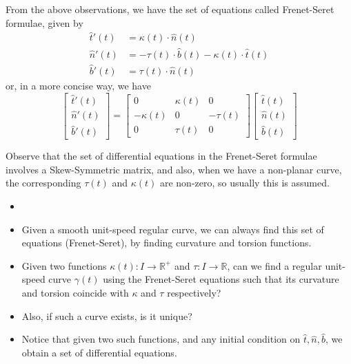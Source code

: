 \begin{theorem}
    From the above observations, we have the set of equations called Frenet-Seret formulae, given by
    $$
    \begin{aligned}
        \hat{t}'(t)&=\kappa(t)\cdot \hat{n}(t)\\ 
        \hat{n}'(t)&=-\tau(t)\cdot \hat{b}(t)-\kappa(t)\cdot \hat{t}(t)\\
        \hat{b}'(t)&=\tau(t)\cdot \hat{n}(t)
    \end{aligned}$$
    or, in a more concise way, we have 
    $$
    \begin{bmatrix}
        \hat{t}'(t)\\ 
        \hat{n}'(t)\\ 
        \hat{b}'(t)
    \end{bmatrix}
    =
    \begin{bmatrix}
        0 & \kappa(t) & 0\\ 
        -\kappa(t) & 0 & -\tau(t)\\ 
        0 & \tau(t) & 0
    \end{bmatrix}
    \begin{bmatrix}
        \hat{t}(t)\\
        \hat{n}(t)\\
        \hat{b}(t)
    \end{bmatrix}
    $$
\end{theorem}
\vspace{0.4cm}
\begin{observe}
    Observe that the set of differential equations in the Frenet-Seret formulae involves a Skew-Symmetric matrix, and also, when we have a non-planar curve, the corresponding $\tau(t)$ and $\kappa(t)$ are non-zero, so usually this is assumed.
\end{observe}
\vspace{0.4cm}
\begin{motive}
    \begin{itemize}
        \item []
        \item Given a smooth unit-speed regular curve, we can always find this set of equations (Frenet-Seret), by finding curvature and torsion functions.
        \item Given two functions $\kappa(t):I\to \mathbb{R}^{+}$ and $\tau:I\to \mathbb{R}$, can we find a regular unit-speed curve $\gamma(t)$ using the Frenet-Seret equations such that its curvature and torsion coincide with $\kappa$ and $\tau$ respectively?
        \item Also, if such a curve exists, is it unique?
        \item Notice that given two such functions, and any initial condition on $\hat{t}, \hat{n}, \hat{b}$, we obtain a set of differential equations.
    \end{itemize}
\end{motive}
\vspace{0.4cm}
